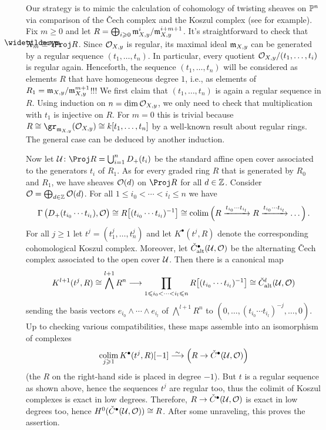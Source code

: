 \begin{proof*}
	Our strategy is to mimic the calculation of cohomology of twisting sheaves on $\mathbb{P}^n$ via comparison of the \v Cech complex and the Koszul complex (see \cite[Theorem~2]{alggeo2} for example). Fix $m\geq 0$ and let $R=\bigoplus_{i\geqslant 0}\mathfrak{m}_{X,y}^i/\mathfrak{m}_{X,y}^{i+m+1}$. It's straightforward to check that $\snake{X}_m\cong \Proj R$. Since $\mathcal{O}_{X,y}$ is regular, its maximal ideal $\mathfrak{m}_{X,y}$ can be generated by a regular sequence $(t_1,\dotsc,t_n)$. In particular, every quotient $\mathcal{O}_{X,y}/(t_1,\dotsc,t_i)$ is regular again. Henceforth, the sequence $(t_1,\dotsc,t_n)$ will be considered as elements $R$ that have homogeneous degree $1$, i.e., as elements of $R_1=\mathfrak{m}_{X,y}/\mathfrak{m}_{X,y}^{m+1}$!!! We first claim that $(t_1,\dotsc,t_n)$ is again a regular sequence in $R$. Using induction on $n=\dim \mathcal{O}_{X,y}$, we only need to check that multiplication with $t_1$ is injective on $R$. For $m=0$ this is trivial because $R\cong \gr_{\mm_{X,y}}(\Oo_{X,y})\cong k[t_1,\dotsc,t_n]$ by a well-known result about regular rings. The general case can be deduced by another induction.
	
	Now let $\Uu\colon \Proj R=\bigcup_{i=1}^nD_+(t_i)$ be the standard affine open cover associated to the generators $t_i$ of $R_1$. As for every graded ring $R$ that is generated by $R_0$ and $R_1$, we have sheaves $\mathcal{O}(d)$ on $\Proj R$ for all $d\in \mathbb{Z}$. Consider $\mathcal{O}=\bigoplus_{d\in \mathbb{Z}}\mathcal{O}(d)$. For all $1\leq i_0<\dotsb<i_l\leq n$ we have
	\begin{equation*}
		\operatorname{\Gamma}\big(D_+(t_{i_0}\dotsm t_{i_l}),\mathcal{O}\big)\cong R\big[(t_{i_0}\dotsm t_{i_l})^{-1}\big]\cong \operatorname*{colim}\Big( R\xrightarrow{t_{i_0}\dotsm t_{i_l}}R\xrightarrow{t_{i_0}\dotsm t_{i_l}}\dotso\Big)\,.
	\end{equation*}
	For all $j\geq 1$ let $t^j=(t_1^j,\dotsc,t_n^j)$ and let $K^\bullet(t^j,R)$ denote the corresponding cohomological Koszul complex. Moreover, let $\check{C}_{\mathrm{alt}}^\bullet(\mathcal{U},\mathcal{O})$ be the alternating \v Cech complex associated to the open cover $\mathcal{U}$. Then there is a canonical map
	\begin{equation*}
		K^{l+1}(t^j,R)\cong \bigwedge^{l+1}R^n\morphism \prod_{1\leq i_0<\dotsb<i_l\leq n}R\big[(t_{i_0}\dotsm t_{i_l})^{-1}\big]\cong \check{C}_\alt^l(\Uu,\Oo)
	\end{equation*}
	sending the basis vectors $e_{i_0}\wedge\dotsb\wedge e_{i_l}$ of $\bigwedge^{l+1}R^n$ to $(0,\dotsc,(t_{i_0}\dotsm t_{i_l})^{-j},\dotsc, 0)$. Up to checking various compatibilities, these maps assemble into an isomorphism of complexes
	\begin{equation*}
		\colimit_{j\geq 1}K^\bullet(t^j,R)[-1]\isomorphism \Big(R\rightarrow \check{C}^\bullet(\Uu,\Oo)\Big)
	\end{equation*}
	(the $R$ on the right-hand side is placed in degree $-1$). But $t$ is a regular sequence as shown above, hence the sequences $t^j$ are regular too, thus the colimit of Koszul complexes is exact in low degrees. Therefore, $R\morphism\check{C}^\bullet(\Uu,\Oo)$ is exact in low degrees too, hence $H^0(\check{C}^\bullet(\mathcal{U},\mathcal{O}))\cong R$. After some unraveling, this proves the assertion.
\end{proof*}
